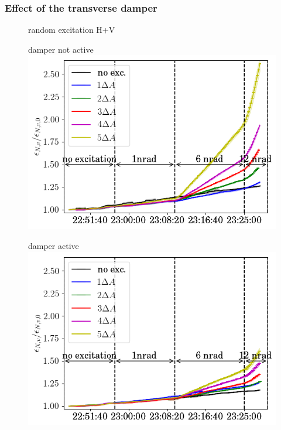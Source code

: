 \documentclass[%
 reprint,
 amsmath,amssymb,
 aps,
prstab,
]{revtex4-1}
\begin{document}
\subsubsection{Effect of the transverse damper\label{sec:damp}}
\begin{figure}[b]
	\centering
	random excitation H+V\\
	\begin{minipage}[t]{0.49\linewidth}
		\centering
		damper not active
		\includegraphics[width=1.0\linewidth]{2017_emitv_avg_rel_vran_no_damper.png}
	\end{minipage}	
	\begin{minipage}[t]{0.49\linewidth}
		\centering
		damper active
		\includegraphics[width=1.0\linewidth]{2017_emitv_avg_rel_vran_with_damper.png}
	\end{minipage}	
	\centering

\end{figure}
\end{document}
